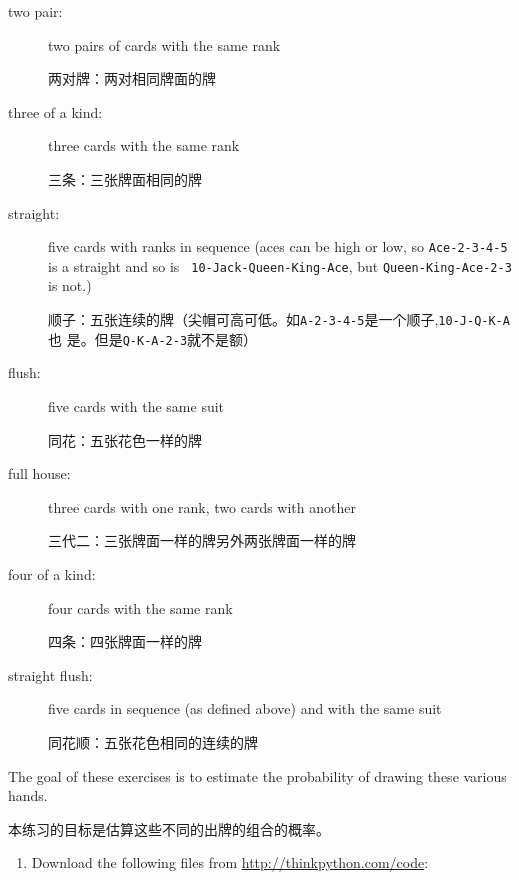 \documentclass[10pt]{book}
\begin{document}
\begin{CJK}{UTF8}{gbsn}
\begin{exercise}
\begin{description}
\item[two pair:] two pairs of cards with the same rank
\vspace{-0.05in}

两对牌：两对相同牌面的牌

\item[three of a kind:] three cards with the same rank
\vspace{-0.05in}

三条：三张牌面相同的牌

\item[straight:] five cards with ranks in sequence (aces can
be high or low, so {\tt Ace-2-3-4-5} is a straight and so is {\tt
10-Jack-Queen-King-Ace}, but {\tt Queen-King-Ace-2-3} is not.)
\vspace{-0.05in}

顺子：五张连续的牌（尖帽可高可低。如{\tt A-2-3-4-5}是一个顺子,{\tt 10-J-Q-K-A}也
是。但是{\tt Q-K-A-2-3}就不是额）

\item[flush:] five cards with the same suit
\vspace{-0.05in}

同花：五张花色一样的牌

\item[full house:] three cards with one rank, two cards with another
\vspace{-0.05in}

三代二：三张牌面一样的牌另外两张牌面一样的牌

\item[four of a kind:] four cards with the same rank
\vspace{-0.05in}

四条：四张牌面一样的牌

\item[straight flush:] five cards in sequence (as defined above) and
with the same suit
\vspace{-0.05in}

同花顺：五张花色相同的连续的牌

\end{description}
%
The goal of these exercises is to estimate
the probability of drawing these various hands.

本练习的目标是估算这些不同的出牌的组合的概率。

\begin{enumerate}

\item Download the following files from \url{http://thinkpython.com/code}:


\end{enumerate}
\end{exercise}
\end{CJK}
\end{document}
